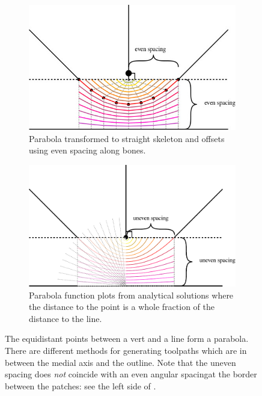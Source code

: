 \begin{figure}
\begin{subfigure}{0.9\columnwidth}
\includegraphics[width=\columnwidth]{sources/method/medial_axis_even_spacing.jpg}
\caption{Parabola transformed to straight skeleton and offsets using even spacing along bones.}
\end{subfigure}
\begin{subfigure}{0.9\columnwidth}
\includegraphics[width=\columnwidth]{sources/method/medial_axis_uneven_spacing.pdf}
\caption{Parabola function plots from analytical solutions where the distance to the point is a whole fraction of the distance to the line.}
\label{medial_axis_parabolas_functions}
\end{subfigure}
\caption{The equidistant points between a vert and a line form a parabola. There are different methods for generating toolpaths which are in between the medial axis and the outline. Note that the uneven spacing does \emph{not} coincide with an even angular spacingat the border between the patches: see the left side of .}
\label{medial_axis_parabolas}
\end{figure}

